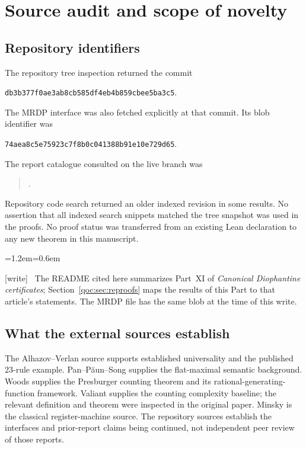 \documentclass[11pt,letterpaper]{article}
\theoremstyle{definition}
\theoremstyle{remark}
\newcommand{\wtag}{\textup{[write]}}
\newenvironment{writenote}{\par\smallskip\begin{list}{}{\leftmargin=1.2em\rightmargin=0.6em}\item[]\small\wtag\ }{\end{list}\smallskip}
\begin{document}
\section{Source audit and scope of novelty}\label{qoc:mp:app:provenance}
\subsection{Repository identifiers}
The repository tree inspection returned the commit
\begin{center}
\texttt{db3b377f0ae3ab8cb585df4eb4b859cbee5ba3c5}.
\end{center}
The MRDP interface was also fetched explicitly at that commit. Its blob
identifier was
\begin{center}
\texttt{74aea8c5e75923c7f8b0c041388b91e10e729d65}.
\end{center}
The report catalogue consulted on the live branch was
\begin{quote}\small
{}.
\end{quote}
Repository code search returned an older indexed revision in some
results. No assertion that all indexed search snippets matched the tree
snapshot was used in the proofs. No proof status was transferred from an
existing Lean declaration to any new theorem in this manuscript.

\begin{writenote}
The README cited here summarizes Part~XI of \emph{Canonical Diophantine certificates}; Section~\ref{qoc:sec:reproofs} maps the results of this Part to that article's statements. The MRDP file has the same blob at the time of this write.
\end{writenote}

\subsection{What the external sources establish}
The Alhazov--Verlan source supports established universality and the
published 23-rule example. Pan--P\u{a}un--Song supplies the flat-maximal
semantic background. Woods supplies the Presburger counting theorem and
its rational-generating-function framework. Valiant supplies the counting
complexity baseline; the relevant definition and theorem were inspected
in the original paper. Minsky is the classical register-machine source.
The repository sources establish the interfaces and prior-report claims
being continued, not independent peer review of those reports.
\end{document}
